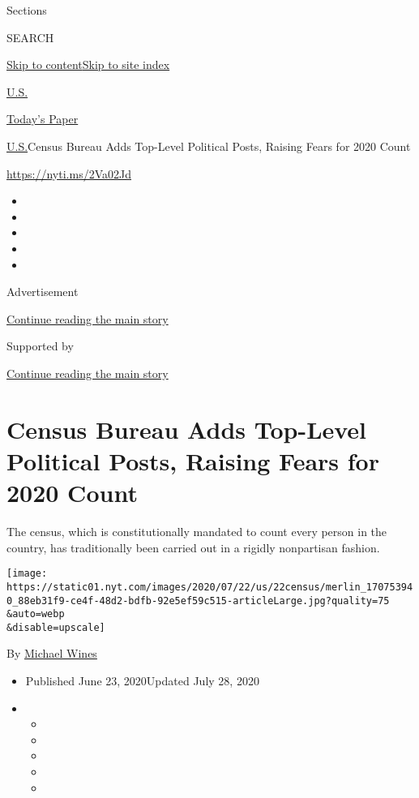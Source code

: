 Sections

SEARCH

\protect\hyperlink{site-content}{Skip to
content}\protect\hyperlink{site-index}{Skip to site index}

\href{https://www.nytimes.com/section/us}{U.S.}

\href{https://myaccount.nytimes.com/auth/login?response_type=cookie\&client_id=vi}{}

\href{https://www.nytimes.com/section/todayspaper}{Today's Paper}

\href{/section/us}{U.S.}\textbar{}Census Bureau Adds Top-Level Political
Posts, Raising Fears for 2020 Count

\url{https://nyti.ms/2Va02Jd}

\begin{itemize}
\item
\item
\item
\item
\item
\end{itemize}

Advertisement

\protect\hyperlink{after-top}{Continue reading the main story}

Supported by

\protect\hyperlink{after-sponsor}{Continue reading the main story}

\hypertarget{census-bureau-adds-top-level-political-posts-raising-fears-for-2020-count}{%
\section{Census Bureau Adds Top-Level Political Posts, Raising Fears for
2020
Count}\label{census-bureau-adds-top-level-political-posts-raising-fears-for-2020-count}}

The census, which is constitutionally mandated to count every person in
the country, has traditionally been carried out in a rigidly nonpartisan
fashion.

\texttt{[image: https://static01.nyt.com/images/2020/07/22/us/22census/merlin\_170753940\_88eb31f9-ce4f-48d2-bdfb-92e5ef59c515-articleLarge.jpg?quality=75\\\&auto=webp\\\&disable=upscale]}

By \href{https://www.nytimes.com/by/michael-wines}{Michael Wines}

\begin{itemize}
\item
  Published June 23, 2020Updated July 28, 2020
\item
  \begin{itemize}
  \item
  \item
  \item
  \item
  \item
  \end{itemize}
\end{itemize}

